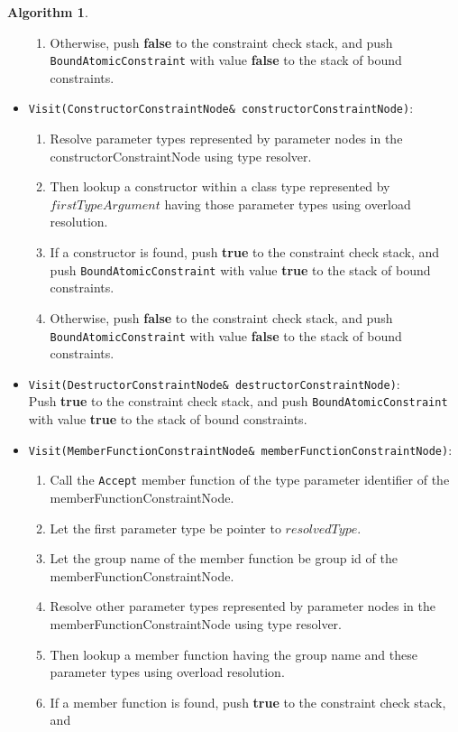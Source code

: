\documentclass[a4paper,oneside,11pt]{book}
\theoremstyle{definition}
\newtheorem{algo}{Algorithm}[section]
\begin{document}
\begin{algo}
\begin{itemize}
\begin{enumerate}
\item
Otherwise, push \textbf{false} to the constraint check stack, and push
\verb|BoundAtomicConstraint| with value \textbf{false} to the stack of bound constraints.
\end{enumerate}
\item
\verb|Visit(ConstructorConstraintNode& constructorConstraintNode)|:\\
\begin{enumerate}
\item
Resolve parameter types represented by parameter nodes in the constructorConstraintNode using type resolver.
\item
Then lookup a constructor within a class type represented by $firstTypeArgument$ having those parameter types using overload resolution.
\item
If a constructor is found, push \textbf{true} to the constraint check stack, and
push \verb|BoundAtomicConstraint| with value \textbf{true} to the stack of bound constraints.
\item
Otherwise, push \textbf{false} to the constraint check stack, and
push \verb|BoundAtomicConstraint| with value \textbf{false} to the stack of bound constraints.
\end{enumerate}
\item
\verb|Visit(DestructorConstraintNode& destructorConstraintNode)|:\\
Push \textbf{true} to the constraint check stack, and
push \verb|BoundAtomicConstraint| with value \textbf{true} to the stack of bound constraints.
\item
\verb|Visit(MemberFunctionConstraintNode& memberFunctionConstraintNode)|:\\
\begin{enumerate}
\item
Call the \verb|Accept| member function of the type parameter identifier of the memberFunctionConstraintNode.
\item
Let the first parameter type be pointer to $resolvedType$.
\item
Let the group name of the member function be group id of the memberFunctionConstraintNode.
\item
Resolve other parameter types represented by parameter nodes in the memberFunctionConstraintNode using type resolver.
\item
Then lookup a member function having the group name and these parameter types using overload resolution.
\item
If a member function is found, push \textbf{true} to the constraint check stack, and

\end{enumerate}
\end{itemize}
\end{algo}
\end{document}

